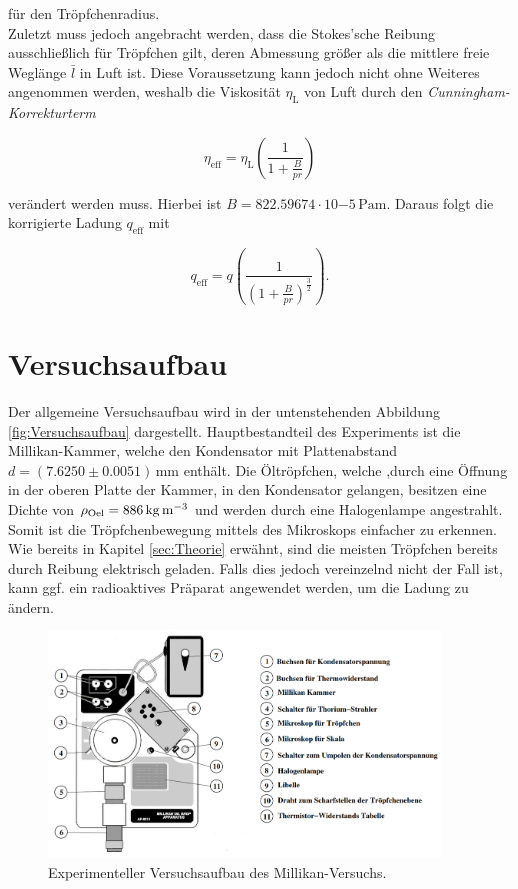 \noindent für den Tröpfchenradius.\\

\noindent Zuletzt muss jedoch angebracht werden, dass die Stokes'sche Reibung ausschließlich für Tröpfchen gilt, deren Abmessung
größer als die mittlere freie Weglänge $\bar{l}$ in Luft ist. Diese Voraussetzung kann jedoch nicht ohne Weiteres
angenommen werden, weshalb die Viskosität $\eta_\text{L}$ von Luft durch den \emph{Cunningham-Korrekturterm} 

\begin{equation*}
    \eta_\text{eff} = \eta_\text{L}\left(\frac{1}{1 + \frac{B}{pr}}\right)
\end{equation*}

\noindent verändert werden muss. Hierbei ist $B = 822.59674\cdot{}10{-5}\,\unit{\pascal\meter}$. Daraus folgt die korrigierte 
Ladung $q_\text{eff}$ mit 

\begin{equation*}
    q_\text{eff} = q\left(\frac{1}{\left(1+\frac{B}{pr}\right)^{\frac{3}{2}}}\right).
\end{equation*}

\section{Versuchsaufbau}
\label{sec:Versuchsaufbau}

\noindent Der allgemeine Versuchsaufbau wird in der untenstehenden Abbildung \ref{fig:Versuchsaufbau} dargestellt. Hauptbestandteil des Experiments
ist die Millikan-Kammer, welche den Kondensator mit Plattenabstand $d = \left(7.6250\pm0.0051\right)
\,\unit{\milli\meter}$ enthält. Die Öltröpfchen, welche ,durch eine Öffnung in der oberen Platte der Kammer,
in den Kondensator gelangen, besitzen eine Dichte von $\rho_\text{Oel}= 886\,\unit[per-mode=reciprocal]{\kilo\gram\per\cubic\meter}$ und 
werden durch eine Halogenlampe angestrahlt. Somit ist die Tröpfchenbewegung mittels des Mikroskops einfacher zu erkennen. Wie bereits 
in Kapitel \ref{sec:Theorie} erwähnt, sind die meisten Tröpfchen bereits durch Reibung elektrisch geladen. Falls dies 
jedoch vereinzelnd nicht der Fall ist, kann ggf. ein radioaktives Präparat angewendet werden, um die Ladung zu ändern.

\begin{figure}
    \centering 
    \includegraphics[height=6cm]{Aufbau.png}
    \caption{Experimenteller Versuchsaufbau des Millikan-Versuchs\cite{Versuchsanleitung_v503}.}
    \label{fig:Aufbau}
\end{figure}

